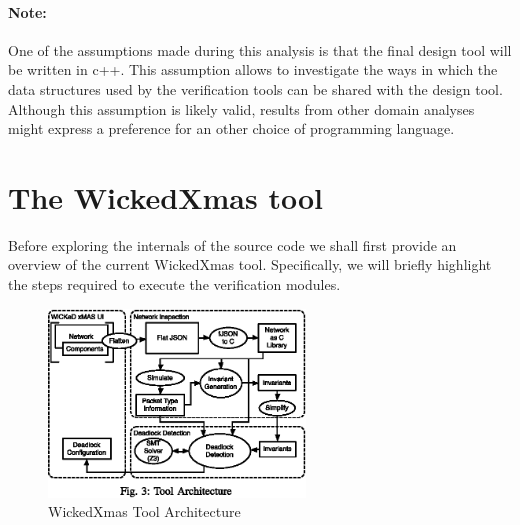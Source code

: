\documentclass[a4paper,11pt]{article}
\begin{document}
\paragraph{Note:}
One of the assumptions made during this analysis is that the final design tool will be
written in c++. This assumption allows to investigate the ways in which the data structures
used by the verification tools can be shared with the design tool. Although this assumption
is likely valid, results from other domain analyses might express a preference for an
other choice of programming language.

\tableofcontents

\newpage

\section{The WickedXmas tool}


Before exploring the internals of the source code we shall first provide an overview
of the current WickedXmas tool. Specifically, we will briefly highlight the steps required
to execute the verification modules.

\begin{figure}[h]
  \includegraphics[height=5cm]{images/wickedxmas-arch.eps}
  \caption{WickedXmas Tool Architecture}
  \label{fig:wickedxmas-arch}
\end{figure}
\end{document}
